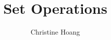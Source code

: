 \documentclass{article}
\title{Set Operations}
\author{Christine Hoang}
\begin{document}
\maketitle

\section{}
\end{document}
